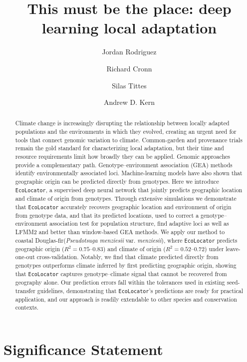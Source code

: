 \documentclass[]{article}
\title{This must be the place: deep learning local adaptation}
\author[1*]{Jordan Rodriguez}
\author[2]{Richard Cronn}
\author[1]{Silas Tittes}
\author[1]{Andrew D. Kern}
\affil[1]{Department of Biology, University of Oregon, Eugene, USA.}
\affil[2]{Pacific Northwest Research Station, USDA Forest Service, Corvallis, Oregon, USA.}
\affil[*]{Address correspondence to: jrodrig8@uoregon.edu}
\newcommand{\dfir}{Douglas-fir\xspace}
\newcommand{\ecolocator}{\texttt{EcoLocator}\xspace}
\begin{document}
\maketitle

\ifdefined\revisionmode\linenumbers\fi

\begin{abstract}
Climate change is increasingly disrupting the relationship between 
locally adapted populations and the environments in which they evolved, 
creating an urgent need for tools that connect genomic variation to climate. 
Common-garden and provenance trials remain the gold standard 
for characterizing local adaptation, 
but their time and resource requirements limit how broadly they can be applied. 
Genomic approaches provide a complementary path.
Genotype--environment association (GEA) methods identify environmentally associated loci.
Machine-learning models have also shown that geographic origin can be predicted
directly from genotypes.
Here we introduce \ecolocator, 
a supervised deep neural network that jointly predicts geographic location 
and climate of origin from genotypes. 
Through extensive simulations we demonstrate that
\ecolocator accurately recovers geographic location and environment of origin from genotype data,
and that its predicted locations, used to correct a genotype--environment association test for population structure,
find adaptive loci as well as LFMM2 and better than window-based GEA methods.
We apply our method to coastal \dfir (\textit{Pseudotsuga menziesii} var. \textit{menziesii}),
where \ecolocator predicts geographic origin ($R^2=0.75$--$0.83$) and climate of origin
($R^2=0.52$--$0.72$) under leave-one-out cross-validation.
Notably, we find that climate predicted directly from genotypes outperforms climate inferred by first
predicting geographic origin, showing that \ecolocator captures genotype--climate signal
that cannot be recovered from geography alone.
Our prediction errors fall within the tolerances used in existing seed-transfer guidelines,
demonstrating that \ecolocator's predictions are ready for practical application, and our approach is
readily extendable to other species and conservation contexts.




\end{abstract}

\section{Significance Statement}
\end{document}

